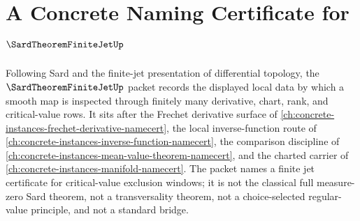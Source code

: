 \chapter{A Concrete Naming Certificate for $\SardTheoremFiniteJetUp$}
\label{ch:concrete-instances-sard-theorem-finite-jet-namecert}

Following Sard and the finite-jet presentation of differential topology, the $\SardTheoremFiniteJetUp$ packet records the displayed local data by which a smooth map is inspected through finitely many derivative, chart, rank, and critical-value rows. It sits after the Frechet derivative surface of \autoref{ch:concrete-instances-frechet-derivative-namecert}, the local inverse-function route of \autoref{ch:concrete-instances-inverse-function-namecert}, the comparison discipline of \autoref{ch:concrete-instances-mean-value-theorem-namecert}, and the charted carrier of \autoref{ch:concrete-instances-manifold-namecert}. The packet names a finite jet certificate for critical-value exclusion windows; it is not the classical full measure-zero Sard theorem, not a transversality theorem, not a choice-selected regular-value principle, and not a standard bridge.

